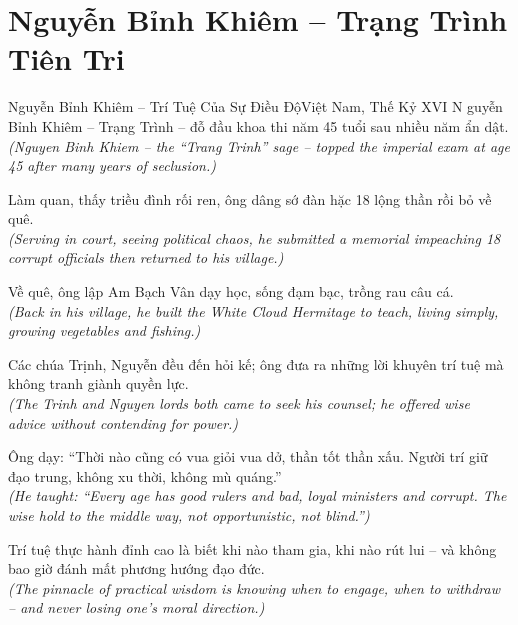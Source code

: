 \section{Nguyễn Bỉnh Khiêm -- Trạng Trình Tiên Tri}
\begin{truyen}{Nguyễn Bỉnh Khiêm -- Trí Tuệ Của Sự Điều Độ}{Việt Nam, Thế Kỷ XVI}
N guyễn Bỉnh Khiêm -- Trạng Trình -- đỗ đầu khoa thi năm 45 tuổi sau nhiều năm ẩn dật.\\
\textit{(Nguyen Binh Khiem -- the ``Trang Trinh'' sage -- topped the imperial exam at age 45 after many years of seclusion.)}

Làm quan, thấy triều đình rối ren, ông dâng sớ đàn hặc 18 lộng thần rồi bỏ về quê.\\
\textit{(Serving in court, seeing political chaos, he submitted a memorial impeaching 18 corrupt officials then returned to his village.)}

Về quê, ông lập Am Bạch Vân dạy học, sống đạm bạc, trồng rau câu cá.\\
\textit{(Back in his village, he built the White Cloud Hermitage to teach, living simply, growing vegetables and fishing.)}

Các chúa Trịnh, Nguyễn đều đến hỏi kế; ông đưa ra những lời khuyên trí tuệ mà không tranh giành quyền lực.\\
\textit{(The Trinh and Nguyen lords both came to seek his counsel; he offered wise advice without contending for power.)}

Ông dạy: ``Thời nào cũng có vua giỏi vua dở, thần tốt thần xấu. Người trí giữ đạo trung, không xu thời, không mù quáng.''\\
\textit{(He taught: ``Every age has good rulers and bad, loyal ministers and corrupt. The wise hold to the middle way, not opportunistic, not blind.'')}

\end{truyen}
\begin{baihoc}
  Trí tuệ thực hành đỉnh cao là biết khi nào tham gia, khi nào rút lui -- và không bao giờ đánh mất phương hướng đạo đức.\\
  \textit{(The pinnacle of practical wisdom is knowing when to engage, when to withdraw -- and never losing one's moral direction.)}
\end{baihoc}


